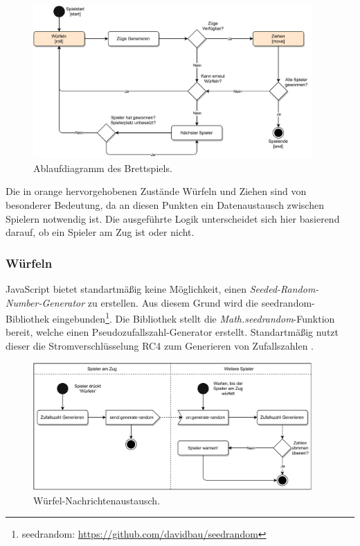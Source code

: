 \begin{figure}[h]
\centering
\includegraphics[width=0.95\textwidth]{bilder/PDF_SVG/MAEDN_ABLAUF.pdf}
\caption{Ablaufdiagramm des Brettspiels.}
\label{fig:maednablauf}
\end{figure}

Die in orange hervorgehobenen Zustände \glqq{}Würfeln\grqq{} und \glqq{}Ziehen\grqq{} sind von besonderer Bedeutung, da an diesen Punkten ein Datenaustausch zwischen Spielern notwendig ist. Die ausgeführte Logik unterscheidet sich hier basierend darauf, ob ein Spieler am Zug ist oder nicht.\par

\subsubsection{Würfeln}
JavaScript bietet standartmäßig keine Möglichkeit, einen \textit{Seeded-Random-Number-Generator} zu erstellen. Aus diesem Grund wird die \glqq{}seedrandom\grqq{}-Bibliothek eingebunden\footnote{seedrandom: \url{https://github.com/davidbau/seedrandom}}. Die Bibliothek stellt die \textit{Math.seedrandom}-Funktion bereit, welche einen Pseudozufallszahl-Generator erstellt. Standartmäßig nutzt dieser die Stromverschlüsselung \acf{RC4} zum Generieren von Zufallszahlen \cite{seedrandom}.

\vspace{6pt}
\begin{figure}[h]
\centering
\includegraphics[width=0.95\textwidth]{bilder/PDF_SVG/MAEDN_WUERFELN.pdf}
\caption{Würfel-Nachrichtenaustausch.}
\label{fig:maednwuerfeln}
\end{figure}


